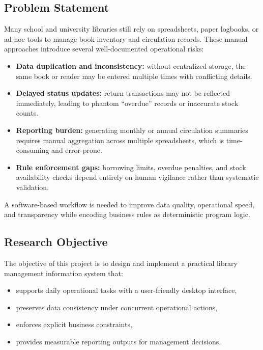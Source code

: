 \documentclass[12pt,a4paper]{article}
\begin{document}
\subsection{Problem Statement}
Many school and university libraries still rely on spreadsheets, paper logbooks, or ad-hoc tools to manage book inventory and circulation records. These manual approaches introduce several well-documented operational risks:
\begin{itemize}[leftmargin=1.5cm]
    \item \textbf{Data duplication and inconsistency:} without centralized storage, the same book or reader may be entered multiple times with conflicting details.
    \item \textbf{Delayed status updates:} return transactions may not be reflected immediately, leading to phantom ``overdue'' records or inaccurate stock counts.
    \item \textbf{Reporting burden:} generating monthly or annual circulation summaries requires manual aggregation across multiple spreadsheets, which is time-consuming and error-prone.
    \item \textbf{Rule enforcement gaps:} borrowing limits, overdue penalties, and stock availability checks depend entirely on human vigilance rather than systematic validation.
\end{itemize}
A software-based workflow is needed to improve data quality, operational speed, and transparency while encoding business rules as deterministic program logic.

\subsection{Research Objective}
The objective of this project is to design and implement a practical library management information system that:
\begin{itemize}[leftmargin=1.5cm]
    \item supports daily operational tasks with a user-friendly desktop interface,
    \item preserves data consistency under concurrent operational actions,
    \item enforces explicit business constraints,
    \item provides measurable reporting outputs for management decisions.
\end{itemize}
\end{document}
